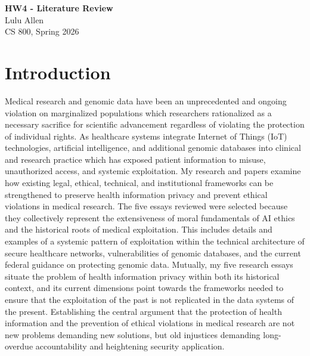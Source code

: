 \documentclass[12pt]{article}
\begin{document}
\begin{centering}
{\large\textbf{HW4 - Literature Review}}\\
\vspace{3mm} %
Lulu Allen\\
CS 800, Spring 2026\\
\end{centering} 



\section{Introduction}
Medical research and genomic data have been an unprecedented and ongoing violation on marginalized populations which researchers rationalized as a necessary sacrifice for scientific advancement regardless of violating the protection of individual rights. As healthcare systems integrate Internet of Things (IoT) technologies, artificial intelligence, and additional genomic databases into clinical and research practice which has exposed patient information to misuse, unauthorized access, and systemic exploitation. My research and papers examine how existing legal, ethical, technical, and institutional frameworks can be strengthened to preserve health information privacy and prevent ethical violations in medical research. The five essays reviewed were selected because they collectively represent the extensiveness of moral fundamentals of AI ethics and the historical roots of medical exploitation. This includes details and examples of a systemic pattern of exploitation within the technical architecture of secure healthcare networks, vulnerabilities of genomic databases, and the current federal guidance on protecting genomic data. Mutually, my five research essays situate the problem of health information privacy within both its historical context, and its current dimensions point towards the frameworks needed to ensure that the exploitation of the past is not replicated in the data systems of the present. Establishing the central argument that the protection of health information and the prevention of ethical violations in medical research are not new problems demanding new solutions, but old injustices demanding long-overdue accountability and heightening security application.
\end{document}
